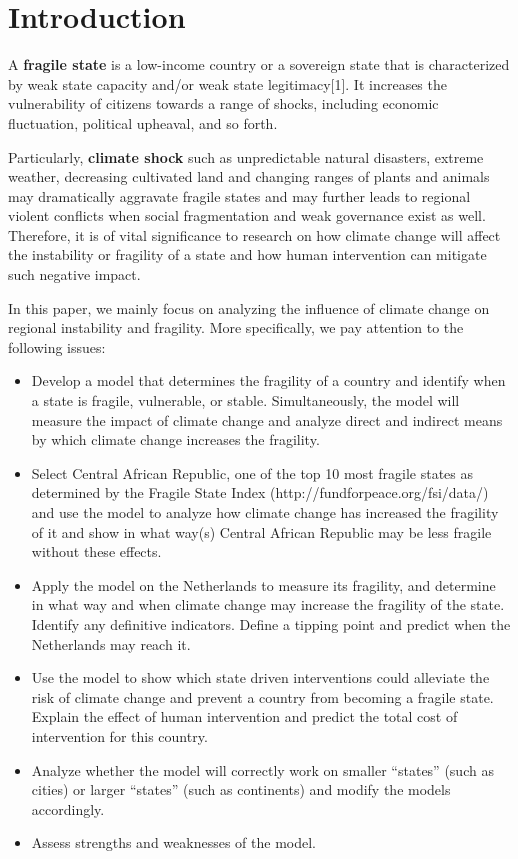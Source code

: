 \documentclass{mcmthesis}
\begin{document}
	\newpage
	\begin{center}
		\tableofcontents
	\end{center}
	\newpage
	
	\section{Introduction}
	
	A \textbf{fragile state} is a low-income country or a sovereign state that is characterized by weak state capacity and/or weak state legitimacy[1]. It increases the vulnerability of citizens towards a range of shocks, including economic fluctuation, political upheaval, and so forth. 
	
	Particularly, \textbf{climate shock} such as unpredictable natural disasters, extreme weather, decreasing cultivated land and changing ranges of plants and animals may dramatically aggravate fragile states and may further leads to regional violent conflicts when social fragmentation and weak governance exist as well. Therefore, it is of vital significance to research on how climate change will affect the instability or fragility of a state and how human intervention can mitigate such negative impact.
	
	In this paper, we mainly focus on analyzing the influence of climate change on regional instability and fragility. More specifically, we pay attention to the following issues:
	\begin{itemize}
		\item Develop a model that determines the fragility of a country and identify when a state is fragile, vulnerable, or stable. Simultaneously, the model will measure the impact of climate change and analyze direct and indirect means by which climate change increases the fragility.
		\item Select Central African Republic, one of the top 10 most fragile states as determined by the Fragile State Index (http://fundforpeace.org/fsi/data/) and use the model to analyze how climate change has increased the fragility of it and show in what way(s) Central African Republic may be less fragile without these effects.
		\item Apply the model on the Netherlands to measure its fragility, and determine in what way and when climate change may increase the fragility of the state. Identify any definitive indicators. Define a tipping point and predict when the Netherlands may reach it.
		\item Use the model to show which state driven interventions could alleviate the risk of climate change and prevent a country from becoming a fragile state. Explain the effect of human intervention and predict the total cost of intervention for this country.
		\item Analyze whether the model will correctly work on smaller “states” (such as cities) or larger “states” (such as continents) and modify the models accordingly.
		\item Assess strengths and weaknesses of the model.
	\end{itemize}
	
\end{document}

